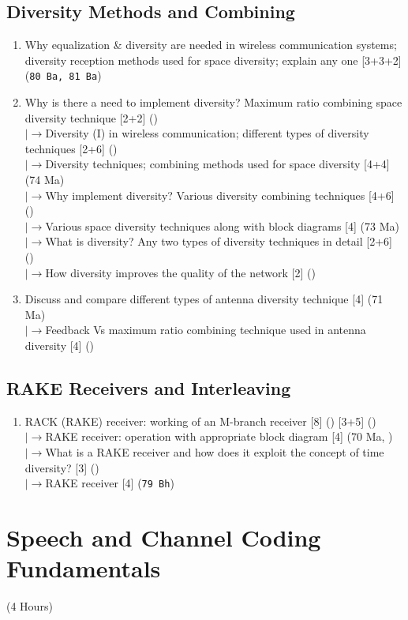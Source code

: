 \documentclass[12pt]{article}
\newcommand{\lb}{\\$\left|\rightarrow\right.$}
\begin{document}
  \subsection{Diversity Methods and Combining}
    \begin{enumerate}[topsep=0pt, noitemsep]
      \item Why equalization \& diversity are needed in wireless communication systems;
        diversity reception methods used for space diversity; explain any one \hfill [3+3+2] (\texttt{80 Ba, 81 Ba})
      \item Why is there a need to implement diversity? Maximum ratio combining
        space diversity technique \hfill [2+2] ()
        \lb Diversity (I) in wireless communication; different types of diversity techniques \hfill [2+6] ()
        \lb Diversity techniques; combining methods used for space diversity \hfill [4+4] (74 Ma)
        \lb Why implement diversity? Various diversity combining techniques \hfill [4+6] ()
        \lb Various space diversity techniques along with block diagrams \hfill [4] (73 Ma)
        \lb What is diversity? Any two types of diversity techniques in detail \hfill [2+6] ()
        \lb How diversity improves the quality of the network \hfill [2] ()
      \item Discuss and compare different types of antenna diversity technique \hfill [4] (71 Ma)
        \lb Feedback Vs maximum ratio combining technique used in antenna diversity \hfill [4] ()
    \end{enumerate}

  \subsection{RAKE Receivers and Interleaving}
    \begin{enumerate}[topsep=0pt, noitemsep]
      \item RACK (RAKE) receiver: working of an M-branch receiver \hfill [8] () [3+5] ()
        \lb RAKE receiver: operation with appropriate block diagram \hfill [4] (70 Ma, )
        \lb What is a RAKE receiver and how does it exploit the concept of time diversity? \hfill [3] ()
        \lb RAKE receiver \hfill [4] (\texttt{79 Bh})
    \end{enumerate}

\pagebreak
\section{Speech and Channel Coding Fundamentals}
\begin{center}(4 Hours)\end{center}
\end{document}
